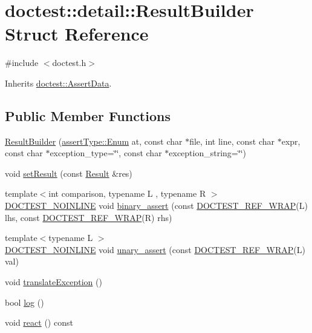 \hypertarget{structdoctest_1_1detail_1_1_result_builder}{}\section{doctest\+:\+:detail\+:\+:Result\+Builder Struct Reference}
\label{structdoctest_1_1detail_1_1_result_builder}


{\ttfamily \#include $<$doctest.\+h$>$}



Inherits \mbox{\hyperlink{structdoctest_1_1_assert_data}{doctest\+::\+Assert\+Data}}.

\subsection*{Public Member Functions}
\begin{DoxyCompactItemize}
\item 
\mbox{\hyperlink{structdoctest_1_1detail_1_1_result_builder_af1af5a8d0991b4fe3548107f111e968d}{Result\+Builder}} (\mbox{\hyperlink{namespacedoctest_1_1assert_type_ae1bb5bed722f34f1c38b83cb19d326d3}{assert\+Type\+::\+Enum}} at, const char $\ast$file, int line, const char $\ast$expr, const char $\ast$exception\+\_\+type=\char`\"{}\char`\"{}, const char $\ast$exception\+\_\+string=\char`\"{}\char`\"{})
\item 
void \mbox{\hyperlink{structdoctest_1_1detail_1_1_result_builder_a86c0ca727fead43263de4a7e9a59ad23}{set\+Result}} (const \mbox{\hyperlink{structdoctest_1_1detail_1_1_result}{Result}} \&res)
\item 
{\footnotesize template$<$int comparison, typename L , typename R $>$ }\\\mbox{\hyperlink{doctest_8h_a47e9d3609dfcc90b9a630ff33b9524d6}{D\+O\+C\+T\+E\+S\+T\+\_\+\+N\+O\+I\+N\+L\+I\+NE}} void \mbox{\hyperlink{structdoctest_1_1detail_1_1_result_builder_ab3d55b158b3ae687f80bca94db6bb701}{binary\+\_\+assert}} (const \mbox{\hyperlink{doctest_8h_af2901cafb023c57fb672ccb1bf14f2eb}{D\+O\+C\+T\+E\+S\+T\+\_\+\+R\+E\+F\+\_\+\+W\+R\+AP}}(L) lhs, const \mbox{\hyperlink{doctest_8h_af2901cafb023c57fb672ccb1bf14f2eb}{D\+O\+C\+T\+E\+S\+T\+\_\+\+R\+E\+F\+\_\+\+W\+R\+AP}}(R) rhs)
\item 
{\footnotesize template$<$typename L $>$ }\\\mbox{\hyperlink{doctest_8h_a47e9d3609dfcc90b9a630ff33b9524d6}{D\+O\+C\+T\+E\+S\+T\+\_\+\+N\+O\+I\+N\+L\+I\+NE}} void \mbox{\hyperlink{structdoctest_1_1detail_1_1_result_builder_a98c33e90242e2859255a79cb38489f3b}{unary\+\_\+assert}} (const \mbox{\hyperlink{doctest_8h_af2901cafb023c57fb672ccb1bf14f2eb}{D\+O\+C\+T\+E\+S\+T\+\_\+\+R\+E\+F\+\_\+\+W\+R\+AP}}(L) val)
\item 
void \mbox{\hyperlink{structdoctest_1_1detail_1_1_result_builder_a5eece6aa3b1a2cb366cf5a0cc6c854a3}{translate\+Exception}} ()
\item 
bool \mbox{\hyperlink{structdoctest_1_1detail_1_1_result_builder_a2af75dd1d8db8d3aa949d78025854085}{log}} ()
\item 
void \mbox{\hyperlink{structdoctest_1_1detail_1_1_result_builder_a03686f862471728c2980d72e02980213}{react}} () const
\end{DoxyCompactItemize}

